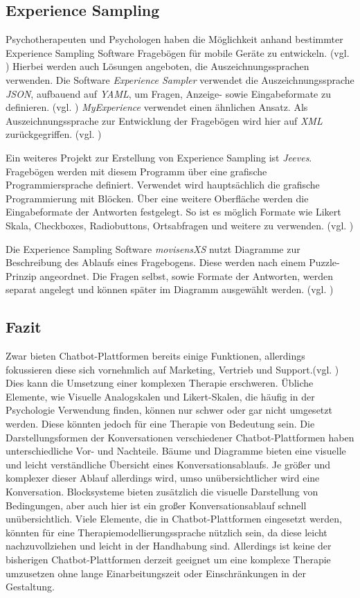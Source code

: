 \subsection{Experience Sampling}
Psychotherapeuten und Psychologen haben die Möglichkeit anhand bestimmter Experience Sampling Software Fragebögen für mobile Geräte zu entwickeln. (vgl. \cite{OSFSabri6:online}) Hierbei werden auch Lösungen angeboten, die  Auszeichnungssprachen verwenden. Die Software \emph{Experience Sampler} verwendet die Auszeichnungssprache \emph{JSON}, aufbauend auf \emph{YAML}, um Fragen, Anzeige- sowie Eingabeformate zu definieren. (vgl. \cite{OSFSabri6:online}) \emph{MyExperience} verwendet einen ähnlichen Ansatz. Als Auszeichnungssprache zur Entwicklung der Fragebögen wird hier auf \emph{XML} zurückgegriffen. (vgl. \cite{theMyExp48:online})

Ein weiteres Projekt zur Erstellung von Experience Sampling ist \emph{Jeeves}. Fragebögen werden mit diesem Programm über eine grafische Programmiersprache definiert. Verwendet wird hauptsächlich die grafische Programmierung mit Blöcken. Über eine weitere Oberfläche werden die Eingabeformate der Antworten festgelegt. So ist es möglich Formate wie Likert Skala, Checkboxes, Radiobuttons, Ortsabfragen und weitere zu verwenden. (vgl. \cite{Rough2017})

Die Experience Sampling Software \emph{movisensXS} nutzt Diagramme zur Beschreibung des Ablaufs eines Fragebogens. Diese werden nach einem Puzzle-Prinzip angeordnet. Die Fragen selbst, sowie Formate der Antworten, werden separat angelegt und können später im Diagramm ausgewählt werden. (vgl. \cite{movisens59:online})


\subsection{Fazit}

Zwar bieten Chatbot-Plattformen bereits einige Funktionen, allerdings fokussieren diese sich vornehmlich auf Marketing, Vertrieb und Support.(vgl. \cite{Chatfuel3:online} \cite{Converse15:online} \cite{ManyChat78:online}) Dies kann die Umsetzung einer komplexen Therapie erschweren. Übliche Elemente, wie Visuelle Analogskalen und Likert-Skalen, die häufig in der Psychologie Verwendung finden, können nur schwer oder gar nicht umgesetzt werden. Diese könnten jedoch für eine Therapie von Bedeutung sein. Die Darstellungsformen der Konversationen verschiedener Chatbot-Plattformen haben unterschiedliche Vor- und Nachteile. Bäume und Diagramme bieten eine visuelle und leicht verständliche Übersicht eines Konversationsablaufs. Je größer und komplexer dieser Ablauf allerdings wird, umso unübersichtlicher wird eine Konversation. Blocksysteme bieten zusätzlich die visuelle Darstellung von Bedingungen, aber auch hier ist ein großer Konversationsablauf schnell unübersichtlich. Viele Elemente, die in Chatbot-Plattformen eingesetzt werden, könnten für eine Therapiemodellierungssprache nützlich sein, da diese leicht nachzuvollziehen und leicht in der Handhabung sind. Allerdings ist keine der bisherigen Chatbot-Plattformen derzeit geeignet um eine komplexe Therapie umzusetzen ohne lange Einarbeitungszeit oder Einschränkungen in der Gestaltung. 

